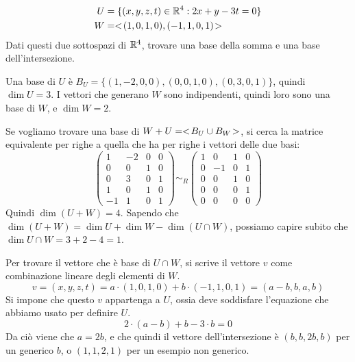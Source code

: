 \begin{exmp}
\begin{align*}
U &= \{ (x,y,z,t) \in \mathbb{R}^4 : 2x + y - 3t = 0\} \\
W &= <\!{(1,0,1,0), (-1,1,0,1)}\!>
\end{align*}
Dati questi due sottospazi di $\mathbb{R}^4$, trovare una base della somma e una base dell'intersezione.

Una base di $U$ \`e $B_U = \{(1,-2,0,0), (0,0,1,0), (0,3,0,1)\}$, quindi $\dim U = 3$. I vettori che generano $W$ sono indipendenti, quindi loro sono una base di $W$, e $\dim W = 2$.

Se vogliamo trovare una base di $W + U = <\!{ B_U \cup B_W }\!>$, si cerca la matrice equivalente per righe a quella che ha per righe i vettori delle due basi:
\[
\begin{pmatrix}
1 & -2 & 0 & 0 \\
0 & 0 & 1 & 0 \\
0 & 3 & 0 & 1 \\
1 & 0 & 1 & 0 \\
-1 & 1 & 0 & 1
\end{pmatrix}
\sim_R
\begin{pmatrix}
1 & 0 & 1 & 0 \\
0 & -1 & 0 & 1 \\
0 & 0 & 1 & 0 \\ 
0 & 0 & 0 & 1 \\
0 & 0 & 0 & 0
\end{pmatrix}
\]
Quindi $\dim (U + W) = 4$. Sapendo che $\dim (U + W) = \dim U + \dim W - \dim (U \cap W)$, possiamo capire subito che $\dim U \cap W = 3 + 2 - 4 = 1$.

Per trovare il vettore che \`e base di $U \cap W$, si scrive il vettore $v$ come combinazione lineare degli elementi di $W$.
\[
v = (x, y, z, t) =
a \cdot (1,0,1,0) + b \cdot (-1,1,0,1) =
(a - b, b, a, b)
\]
Si impone che questo $v$ appartenga a $U$, ossia deve soddisfare l'equazione che abbiamo usato per definire $U$.
\[
2 \cdot (a - b) + b - 3 \cdot b = 0
\]
Da ci\`o viene che $a = 2b$, e che quindi il vettore dell'intersezione \`e $(b,b,2b,b)$ per un generico $b$, o $(1,1,2,1)$ per un esempio non generico.
\end{exmp}













